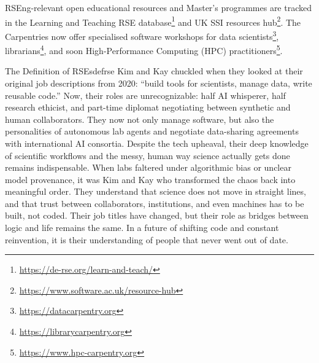 \documentclass{eceasst}
\begin{document}
RSEng-relevant open educational resources and Master's programmes are tracked
in the Learning and Teaching RSE database\footnote{\url{https://de-rse.org/learn-and-teach/}}
and UK SSI resources hub\footnote{\url{https://www.software.ac.uk/resource-hub}}.
The Carpentries now offer specialised software workshops
for data scientists\footnote{\url{https://datacarpentry.org}},
librarians\footnote{\url{https://librarycarpentry.org}},
and soon High-Performance Computing (HPC) practitioners\footnote{\url{https://www.hpc-carpentry.org}}.

\begin{story}{The Definition of RSEs}{defrse}
Kim and Kay chuckled when they looked at their original job descriptions from 2020: ``build tools for scientists, manage data, write reusable code.''
Now, their roles are unrecognizable: half AI whisperer, half research ethicist, and part-time diplomat negotiating between synthetic and human collaborators.
They now not only manage software, but also the personalities of autonomous lab agents and negotiate data-sharing agreements with international AI consortia.
Despite the tech upheaval, their deep knowledge of scientific workflows and the messy, human way science actually gets done remains indispensable.
When labs faltered under algorithmic bias or unclear model provenance, it was Kim and Kay who transformed the chaos back into meaningful order.
They understand that science does not move in straight lines, and that trust between collaborators, institutions, and even machines has to be built, not coded.
Their job titles have changed, but their role as bridges between logic and life remains the same.
In a future of shifting code and constant reinvention, it is their understanding of people that never went out of date.

\end{story}
\end{document}
